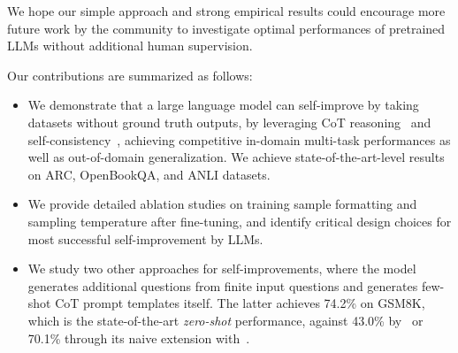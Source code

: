 \documentclass{article} %
\begin{document}
We hope our simple approach and strong empirical results could encourage more future work by the community to investigate optimal performances of pretrained LLMs without additional human supervision.

Our contributions are summarized as follows:
\begin{itemize}
    \item We demonstrate that a large language model can self-improve by taking datasets without ground truth outputs, by leveraging CoT reasoning~\citep{Wei2022ChainOT} and self-consistency~\citep{Wang2022SelfConsistencyIC}, achieving competitive in-domain multi-task performances as well as out-of-domain generalization. We achieve state-of-the-art-level results on ARC, OpenBookQA, and ANLI datasets.
    \item We provide detailed ablation studies on training sample formatting and sampling temperature after fine-tuning, and identify critical design choices for most successful self-improvement by LLMs.
    \item We study two other approaches for self-improvements, where the model generates additional questions from finite input questions and generates few-shot CoT prompt templates itself. The latter achieves 74.2\% on GSM8K, which is the state-of-the-art \textit{zero-shot} performance, against 43.0\% by~\citet{step_by_step} or 70.1\% through its naive extension with~\citet{Wang2022SelfConsistencyIC}. 
\end{itemize}
\end{document}
